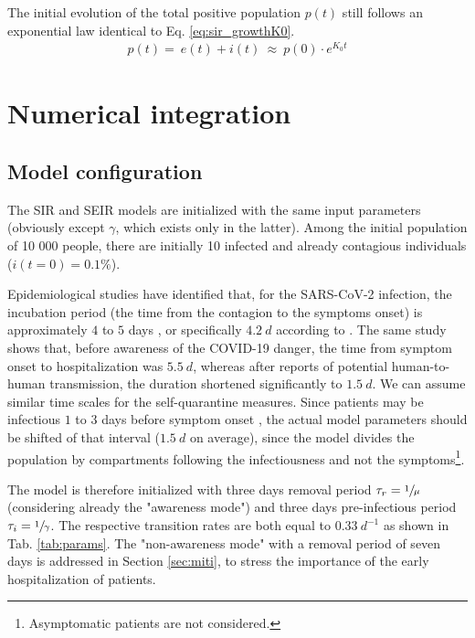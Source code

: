 \documentclass[DIV=12, BCOR=0pt]{scrartcl}  %
\begin{document}
 The initial evolution of the total positive population $p(t)$ still follows an exponential law identical to Eq. \ref{eq:sir_growthK0}.
 \begin{align}
		p(t) = \ e(t) + i(t) \ \approx \  p(0) \cdot e^{K_0 t}
 \end{align}
 
	\section{Numerical integration}
	\label{sec:numerical}
	
  \subsection{Model configuration}
	The SIR and SEIR models are initialized with the same input parameters (obviously except $\gamma$, which exists only in the latter). Among the initial population of 10 000 people, there are initially 10 infected and already contagious individuals ($i(t \! = \! 0) = 0.1 \%$).
	
	Epidemiological studies have identified that, for the SARS-CoV-2 infection, the incubation period (the time from the contagion to the symptoms onset) is approximately $4$ to $5$ days \citep{Gandhi2020}, or specifically $4.2 \ d$ according to \citet{Sanche2020}. The same study shows that, before awareness of the COVID-19 danger, the time from symptom onset to hospitalization was $5.5 \ d$, whereas after reports of potential human-to-human transmission, the duration shortened significantly to $1.5 \ d$. We can assume similar time scales for the self-quarantine measures. Since patients may be infectious $1$ to $3$ days before symptom onset \citep{Gandhi2020}, the actual model parameters should be shifted of that interval ($1.5 \ d$ on average), since the model divides the population by compartments following the infectiousness and not the symptoms\footnote{Asymptomatic patients are not considered.}.
	
  The model is therefore initialized with three days removal period $\tau_r = \sfrac{1}{\mu}$ (considering already the "awareness mode") and three days pre-infectious period $\tau_i = \sfrac{1}{\gamma}$. 
  The respective transition rates are both equal to $0.33 \ d^{-1}$ as shown in Tab. \ref{tab:params}. 
  The "non-awareness mode" with a removal period of seven days is addressed in Section \ref{sec:miti}, to stress the importance of the early hospitalization of patients. 
  
 
\end{document}
